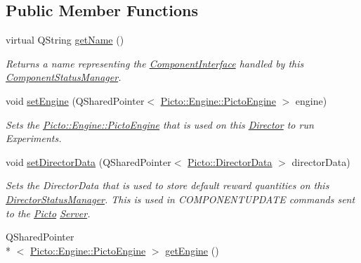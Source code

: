 \subsection*{Public Member Functions}
\begin{DoxyCompactItemize}
\item 
\hypertarget{class_director_status_manager_a0401871f7445c672073aa3bb7a3fe027}{virtual Q\-String \hyperlink{class_director_status_manager_a0401871f7445c672073aa3bb7a3fe027}{get\-Name} ()}\label{class_director_status_manager_a0401871f7445c672073aa3bb7a3fe027}

\begin{DoxyCompactList}\small\item\em Returns a name representing the \hyperlink{class_component_interface}{Component\-Interface} handled by this \hyperlink{class_component_status_manager}{Component\-Status\-Manager}. \end{DoxyCompactList}\item 
\hypertarget{class_director_status_manager_a637aaf1e265f2df5b7fca45335c0468a}{void \hyperlink{class_director_status_manager_a637aaf1e265f2df5b7fca45335c0468a}{set\-Engine} (Q\-Shared\-Pointer$<$ \hyperlink{class_picto_1_1_engine_1_1_picto_engine}{Picto\-::\-Engine\-::\-Picto\-Engine} $>$ engine)}\label{class_director_status_manager_a637aaf1e265f2df5b7fca45335c0468a}

\begin{DoxyCompactList}\small\item\em Sets the \hyperlink{class_picto_1_1_engine_1_1_picto_engine}{Picto\-::\-Engine\-::\-Picto\-Engine} that is used on this \hyperlink{class_director}{Director} to run Experiments. \end{DoxyCompactList}\item 
\hypertarget{class_director_status_manager_a3bd6d6af607ad5c5fb0a0181e5b1123a}{void \hyperlink{class_director_status_manager_a3bd6d6af607ad5c5fb0a0181e5b1123a}{set\-Director\-Data} (Q\-Shared\-Pointer$<$ \hyperlink{class_picto_1_1_director_data}{Picto\-::\-Director\-Data} $>$ director\-Data)}\label{class_director_status_manager_a3bd6d6af607ad5c5fb0a0181e5b1123a}

\begin{DoxyCompactList}\small\item\em Sets the Director\-Data that is used to store default reward quantities on this \hyperlink{class_director_status_manager}{Director\-Status\-Manager}. This is used in C\-O\-M\-P\-O\-N\-E\-N\-T\-U\-P\-D\-A\-T\-E commands sent to the \hyperlink{namespace_picto}{Picto} \hyperlink{class_server}{Server}. \end{DoxyCompactList}\item 
\hypertarget{class_director_status_manager_af3d315b6ea58398d992e297d8c70c06c}{Q\-Shared\-Pointer\\*
$<$ \hyperlink{class_picto_1_1_engine_1_1_picto_engine}{Picto\-::\-Engine\-::\-Picto\-Engine} $>$ \hyperlink{class_director_status_manager_af3d315b6ea58398d992e297d8c70c06c}{get\-Engine} ()}\label{class_director_status_manager_af3d315b6ea58398d992e297d8c70c06c}


\end{DoxyCompactItemize}

